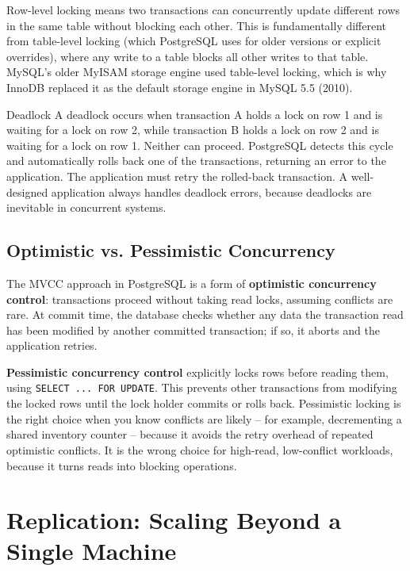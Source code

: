\documentclass[11pt,a4paper]{article}
\begin{document}
Row-level locking means two transactions can concurrently update different rows in the same table without blocking each other. This is fundamentally different from table-level locking (which PostgreSQL uses for older versions or explicit overrides), where any write to a table blocks all other writes to that table. MySQL's older MyISAM storage engine used table-level locking, which is why InnoDB replaced it as the default storage engine in MySQL 5.5 (2010).

\begin{termbox}{Deadlock}
A deadlock occurs when transaction A holds a lock on row 1 and is waiting for a lock on row 2, while transaction B holds a lock on row 2 and is waiting for a lock on row 1. Neither can proceed. PostgreSQL detects this cycle and automatically rolls back one of the transactions, returning an error to the application. The application must retry the rolled-back transaction. A well-designed application always handles deadlock errors, because deadlocks are inevitable in concurrent systems.
\end{termbox}

\subsection{Optimistic vs. Pessimistic Concurrency}

The MVCC approach in PostgreSQL is a form of \textbf{optimistic concurrency control}: transactions proceed without taking read locks, assuming conflicts are rare. At commit time, the database checks whether any data the transaction read has been modified by another committed transaction; if so, it aborts and the application retries.

\textbf{Pessimistic concurrency control} explicitly locks rows before reading them, using \texttt{SELECT ... FOR UPDATE}. This prevents other transactions from modifying the locked rows until the lock holder commits or rolls back. Pessimistic locking is the right choice when you know conflicts are likely -- for example, decrementing a shared inventory counter -- because it avoids the retry overhead of repeated optimistic conflicts. It is the wrong choice for high-read, low-conflict workloads, because it turns reads into blocking operations.

\newpage

\section{Replication: Scaling Beyond a Single Machine}
\end{document}
